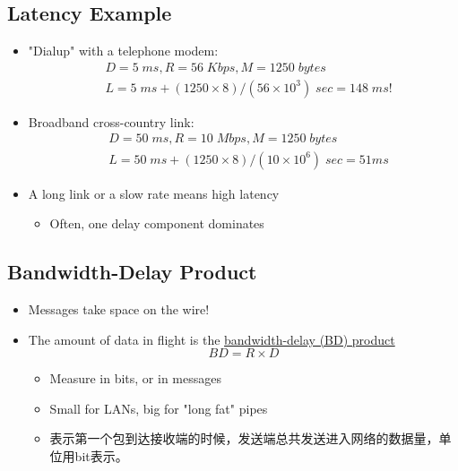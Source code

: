\documentclass[12pt]{ctexart}   %
\begin{document}
	\subsection{Latency Example}
	\begin{itemize}
		\item "Dialup" with a telephone modem:
		\begin{equation}
		\begin{split}
		& D = 5 \; ms, R= 56 \; Kbps, M = 1250 \; bytes \\
		& L  = 5 \; ms + (1250 \times 8) / (56 \times 10^3) \; sec = 148 \; ms!
		\end{split}
		\end{equation}
		
		\item Broadband cross-country link:
		\begin{equation}
		\begin{split}
		& D= 50 \; ms, R= 10 \; Mbps, M= 1250 \; bytes \\
		& L =50 \; ms + (1250 \times 8) / (10 \times 10^6) \; sec = 51 ms
		\end{split}
		\end{equation}
		
		\item A long link or a slow rate means high latency
		\begin{itemize}
			\item Often, one delay component dominates
		\end{itemize}
	\end{itemize}
	
	\subsection{Bandwidth-Delay Product}
	\begin{itemize}
		\item Messages take space on the wire!
		\item The amount of data in flight is the \underline{bandwidth-delay (BD) product}
		$$
		BD = R \times D
		$$
		\begin{itemize}
			\item Measure in bits, or in messages
			\item Small for LANs, big for "long fat" pipes
			\item 表示第一个包到达接收端的时候，发送端总共发送进入网络的数据量，单位用bit表示。
		\end{itemize}
	\end{itemize}
	
\end{document}
